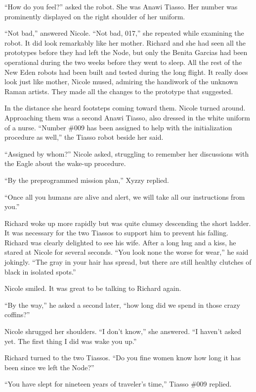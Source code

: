\documentclass[]{article}
\begin{document}
{“How do you feel?” asked the robot.  She was Anawi Tiasso.  Her number was prominently displayed on the right shoulder of her uniform.

“Not bad,” answered Nicole.  “Not bad, 017,” she repeated while examining the robot.  It did look remarkably like her mother.  Richard and she had seen all the prototypes before they had left the Node, but only the Benita Garcias had been operational during the two weeks before they went to sleep.  All the rest of the New Eden robots had been built and tested during the long flight.  It really does look just like mother, Nicole mused, admiring the handiwork of the unknown Raman artists.  They made all the changes to the prototype that suggested.

In the distance she heard footsteps coming toward them.  Nicole turned around.  Approaching them was a second Anawi Tiasso, also dressed in the white uniform of a nurse.  “Number \#009 has been assigned to help with the initialization procedure as well,” the Tiasso robot beside her said.

“Assigned by whom?” Nicole asked, struggling to remember her discussions with the Eagle about the wake-up procedure.

“By the preprogrammed mission plan,” Xyzzy replied.

“Once all you humans are alive and alert, we will take all our instructions from you.”

Richard woke up more rapidly but was quite clumsy descending the short ladder.  It was necessary for the two Tiassos to support him to prevent his falling.  Richard was clearly delighted to see his wife.  After a long hug and a kiss, he stared at Nicole for several seconds.  “You look none the worse for wear,” he said jokingly.  “The gray in your hair has spread, but there are still healthy clutches of black in isolated spots.”

Nicole smiled.  It was great to be talking to Richard again.

“By the way,” he asked a second later, “how long did we spend in those crazy coffins?”

Nicole shrugged her shoulders.  “I don’t know,” she answered.  “I haven’t asked yet.  The first thing I did was wake you up.”

Richard turned to the two Tiassos.  “Do you fine women know how long it has been since we left the Node?”

“You have slept for nineteen years of traveler’s time,” Tiasso \#009 replied.

}
\end{document}
